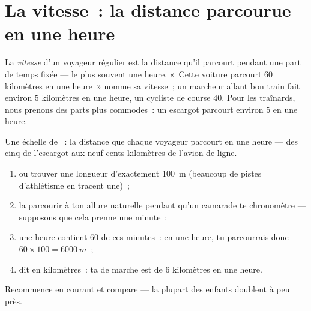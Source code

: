 \section{La vitesse~: la distance parcourue en une heure}

\begin{definition}[Vitesse]\label{def:g5:speed-distance-time:speed}
La \emph{vitesse} d'un voyageur régulier est la
distance qu'il parcourt pendant une part de temps fixée --- le plus
souvent une heure. «~Cette voiture parcourt $60$ kilomètres en une
heure~» nomme sa vitesse~; un marcheur allant bon train fait environ
$5$ kilomètres en une heure, un cycliste de course $40$. Pour les
traînards, nous prenons des parts plus commodes~: un escargot
parcourt environ $5$  en une heure.
\end{definition}

\begin{omfigure}

{\small Une échelle de ~: la distance que chaque voyageur
parcourt en une heure --- des cinq  de l'escargot aux neuf
cents kilomètres de l'avion de ligne.}
\end{omfigure}

\begin{method}\label{met:g5:speed-distance-time:measure}
\begin{enumerate}
  \item {} ou trouver une longueur d'exactement \qty{100}{m}
        (beaucoup de pistes d'athlétisme en tracent une)~;
  \item la parcourir à ton allure naturelle pendant qu'un camarade
        te chronomètre --- supposons que cela prenne une minute~;
  \item une heure contient $60$ de ces minutes~: en une heure, tu
        parcourrais donc $60 \times 100 = \qty{6000}{m}$~;
  \item dit en kilomètres~: ta  de marche est de $6$
        kilomètres en une heure.
\end{enumerate}
Recommence en courant et compare --- la plupart des enfants doublent
à peu près.
\end{method}

